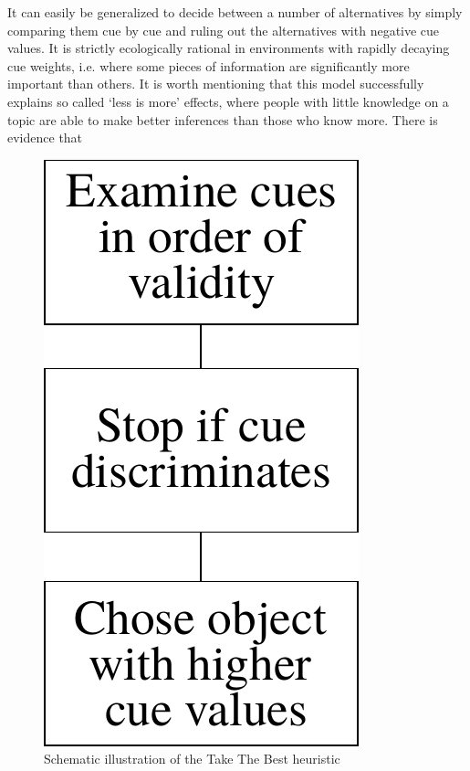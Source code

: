 It can easily be generalized to decide between a number of alternatives by simply comparing them cue by cue and ruling out the alternatives with negative cue values.
It is strictly ecologically rational in environments with rapidly decaying cue weights, i.e. where some pieces of information are significantly more important than others. It is worth mentioning that this model successfully explains so called `less is more' effects, where people with little knowledge on a topic are able to make better inferences than those who know more. There is evidence \citep{Garcia-Retamero2009,Pachur2013} that
\begin{figure}
  \centering
  \includegraphics[width = .18 \textwidth]{figures/TTB.pdf}
  \caption{Schematic illustration of the Take The Best heuristic}
  \label{TTB}
\end{figure}
